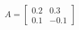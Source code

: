 \documentclass[preview]{standalone}
\begin{document}
\begin{align*}
A = \begin{bmatrix} 0.2 & 0.3 \\ 0.1 & -0.1 \end{bmatrix}
\end{align*}
\end{document}
